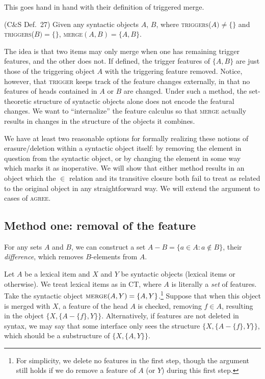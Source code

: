 \documentclass[output=paper]{langsci/langscibook}
\begin{document}
This goes hand in hand with their definition of triggered merge.

\ea\label{ex:key:33.22b}(C\&S\nocite{ColSta2016} Def.\ 27) Given any syntactic
objects $A$, $B$, where \textsc{triggers}($A)\neq \{\}$ and
\textsc{triggers}($B)=\{\}$, \textsc{merge}$(A,B)=\{A,B\}$.  \z

The idea is that two items may only merge when one has remaining trigger
features, and the other does not. If defined, the trigger features of $\{A,B\}$
are just those of the triggering object $A$ with the triggering feature
removed. Notice, however, that \textsc{trigger} keeps track of the feature
changes externally, in that no features of heads contained in $A$ or $B$ are
changed. Under such a method, the set-theoretic structure of syntactic objects
alone does not encode the featural changes. We want to \enquote{internalize} the
feature calculus so that \textsc{merge} actually results in changes in the
structure of the objects it combines.

We have at least two reasonable options for formally realizing these notions of
erasure/deletion within a syntactic object itself: by removing the element in
question from the syntactic object, or by changing the element in some way
which marks it as inoperative. We will show that either method results in an
object which the $\in$ relation and its transitive closure both fail to treat
as related to the original object in any straightforward way. We will extend
the argument to cases of \textsc{agree}.

\subsection{Method one: removal of the feature}

For any sets $A$ and $B$, we can construct a set $A-B=\{a\in A:a\not\in B\}$,
their \emph{difference}, which removes $B$-elements from $A$.

Let $A$ be a lexical item and $X$ and $Y$ be syntactic objects (lexical items
or otherwise). We treat lexical items as in CT, where $A$ is literally a
\emph{set} of features. Take the syntactic object
$\textsc{merge}(A,Y)=\{A,Y\}$.\footnote{For simplicity, we delete no features
in the first step, though the argument still holds if we do remove a feature of
$A$ (or $Y$) during this first step.} Suppose that when this object is merged
with $X$, a feature of the head $A$ is checked, removing $f\in A$, resulting in
the object $\{X,\{A-\{f\},Y\}\}$. Alternatively, if features are not deleted in
syntax, we may say that some interface only sees the structure
$\{X,\{A-\{f\},Y\}\}$, which should be a substructure of $\{X,\{A,Y\}\}$.
\end{document}
